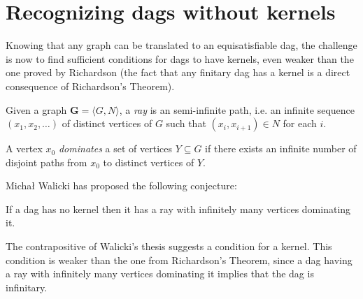 
\section{Recognizing dags without kernels}
\label{sec:Recognizing dags without kernels}
Knowing that any graph can be translated to an equisatisfiable dag, the challenge is now to find sufficient conditions for dags to have kernels, even weaker than the one proved by Richardson (the fact that any finitary dag has a kernel is a direct consequence of Richardson's Theorem).
\begin{definition}
  Given a graph $\mathbf{G} = \langle G,N \rangle$, a \textit{ray} is an semi-infinite path, i.e. an infinite sequence $(x_1, x_2, \dots)$ of distinct vertices of $G$ such that $(x_i,x_{i+1}) \in N$ for each $i$.
\end{definition}
\begin{definition}
  A vertex $x_0$ \textit{dominates} a set of vertices $Y \subseteq G$ if there exists an infinite number of disjoint paths from $x_0$ to distinct vertices of $Y$.
\end{definition}
Michał Walicki has proposed the following conjecture:
\begin{conjecture}
  If a dag has no kernel then it has a ray with infinitely many vertices dominating it.
  \label{thm:ray_conjecture}
\end{conjecture}
The contrapositive of Walicki's thesis suggests a condition for a kernel.
This condition is weaker than the one from Richardson's Theorem, since a dag having a ray with infinitely many vertices dominating it implies that the dag is infinitary.
